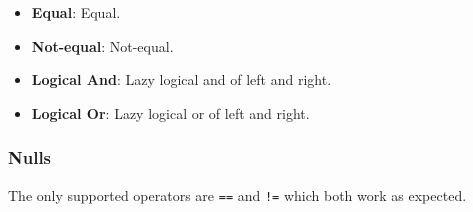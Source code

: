 \documentclass[12pt, letterpaper]{article}
\begin{document}
\begin{itemize}
    \item \textbf{Equal}: Equal.
    \item \textbf{Not-equal}: Not-equal.
    \item \textbf{Logical And}: Lazy logical and of left and right.
    \item \textbf{Logical Or}: Lazy logical or of left and right.
\end{itemize}

\subsubsection{Nulls}

The only supported operators are \verb|==| and \verb|!=| which both work as expected.

\end{document}
